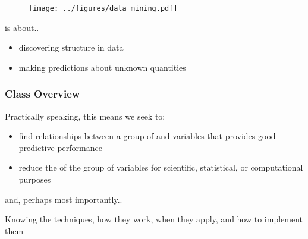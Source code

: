 \documentclass{beamer}
\begin{document}
\title{}
\subtitle{\classTitle}
\date{}



\begin{frame}
\maketitle
%
\organization
%
\end{frame}



\begin{frame}

\begin{figure}[h!]
  \centering
  \texttt{[image: ../figures/data\_mining.pdf]}
\end{figure}
\vsp

 is about..
\vsp
 
\begin{itemize} 
\item discovering structure in data
\item making predictions about unknown quantities
\end{itemize}


\end{frame}

\begin{frame}
\frametitle{Class Overview}

Practically speaking, this means we seek to:
\vsp

\begin{itemize}
\item 
find relationships between a group of  and  variables that
provides good predictive performance
\item reduce the  of the group of variables for scientific, statistical, or computational
purposes
\end{itemize}
\vsp

and, perhaps most importantly..

\vsp
Knowing the techniques, how they work, when they apply, and how to implement them

\end{frame}
\end{document}
